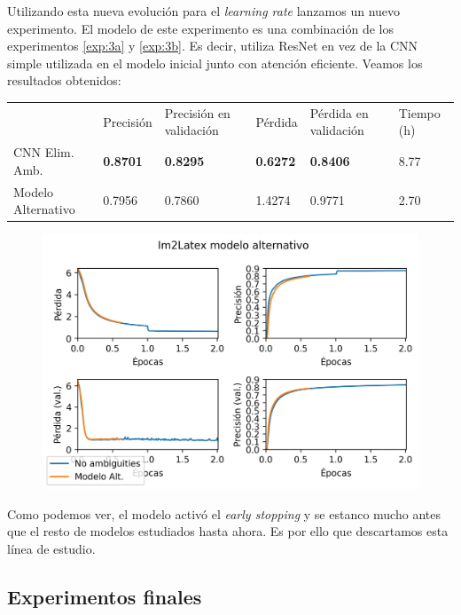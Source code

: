 \documentclass[a4paper, 20pt, dvipsnames]{article}
\begin{document}
Utilizando esta nueva evolución para el \emph{learning rate} lanzamos un nuevo
experimento. El modelo de este experimento es una combinación de los experimentos
\ref{exp:3a} y \ref{exp:3b}. Es decir, utiliza ResNet en vez de la CNN simple
utilizada en el modelo inicial junto con atención eficiente. Veamos los resultados
obtenidos:

\begin{table}[H]
	\centering
	\begin{tabular}{llllll}
		& Precisión       & Precisión en validación & Pérdida         & Pérdida en validación & Tiempo (h) \\ \cline{2-6} 
		CNN Elim. Amb.     & \textbf{0.8701} & \textbf{0.8295}         & \textbf{0.6272} & \textbf{0.8406}       & 8.77       \\
		Modelo Alternativo & 0.7956          & 0.7860                  & 1.4274          & 0.9771                & 2.70      
	\end{tabular}
\end{table}

\begin{figure}[H]
	\centering
	\includegraphics{fig/im2latex-4}
\end{figure}

Como podemos ver, el modelo activó el \emph{early stopping} y se estanco mucho antes
que el resto de modelos estudiados hasta ahora. Es por ello que descartamos esta línea
de estudio.


\subsection{Experimentos finales}
\end{document}
